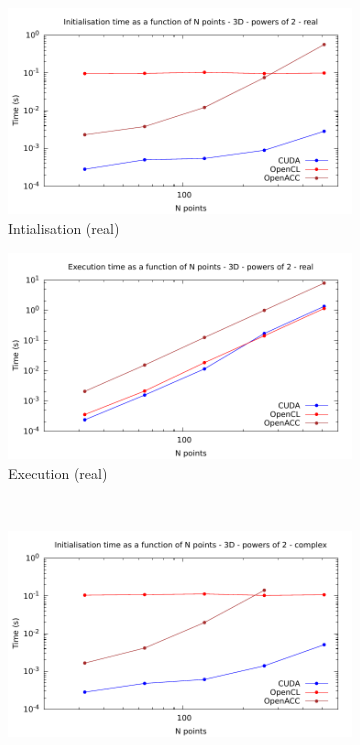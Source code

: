 \documentclass[12pt, a4paper]{article}
\begin{document}
\begin{figure}[H]
\captionsetup{width=0.8\linewidth}
\centering
\begin{subfigure}{.5\textwidth}
\centering
\includegraphics[width=.9\linewidth]{graphs/fft-3d-pow2-r-init.pdf}
\caption{Intialisation (real)}
\label{FFTPOW23DRI}
\end{subfigure}%
\begin{subfigure}{.5\textwidth}
\centering
\includegraphics[width=.9\linewidth]{graphs/fft-3d-pow2-r-exec.pdf}
\caption{Execution (real)}
\label{FFTPOW23DRE}
\end{subfigure}\\
\begin{subfigure}{.5\textwidth}
\centering
\includegraphics[width=.9\linewidth]{graphs/fft-3d-pow2-c-init.pdf}

\end{subfigure}
\end{figure}
\end{document}

